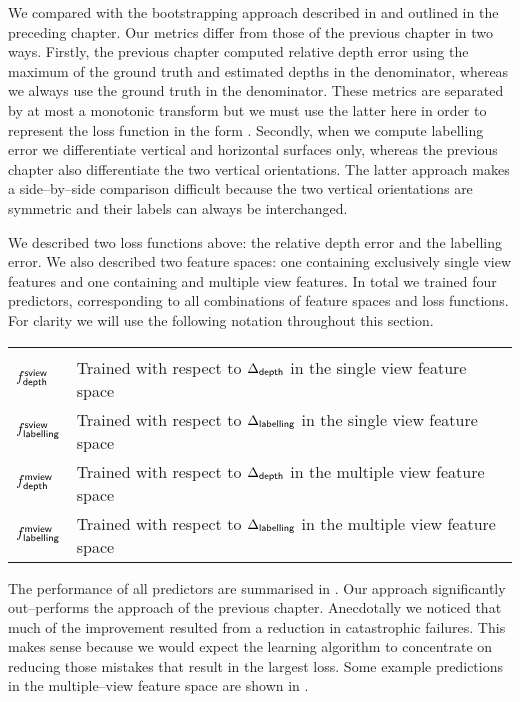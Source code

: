 We compared with the bootstrapping approach described in
\cite{Flint11} and outlined in the preceding chapter. Our metrics
differ from those of the previous chapter in two ways. Firstly, the
previous chapter computed relative depth error using the maximum of
the ground truth and estimated depths in the denominator, whereas we
always use the ground truth in the denominator. These metrics are
separated by at most a monotonic transform but we must use the latter
here in order to represent the loss function in the form
. Secondly, when we compute labelling error
we differentiate vertical and horizontal surfaces only, whereas the
previous chapter also differentiate the two vertical orientations. The
latter approach makes a side--by--side comparison difficult because
the two vertical orientations are symmetric and their labels can
always be interchanged.

We described two loss functions above: the relative depth error and
the labelling error. We also described two feature spaces: one
containing exclusively single view features and one containing and
multiple view features. In total we trained four predictors,
corresponding to all combinations of feature spaces and loss
functions. For clarity we will use the following notation throughout
this section.

\begin{tabular}{p{20mm}l}
  &\\
  $\Fsviewdepth$ & Trained with respect to
  $\DepthLoss$ in the single view feature space \vspace{2mm} \\
  $\Fsviewlbl$ & Trained with respect to
  $\LblLoss$ in the single view feature space \vspace{2mm} \\
  $\Fmviewdepth$ & Trained with respect to
  $\DepthLoss$ in the multiple view feature space \vspace{2mm} \\
  $\Fmviewlbl$ & Trained with respect to
  $\LblLoss$ in the multiple view feature space \vspace{2mm} 
\end{tabular}

The performance of all predictors are summarised in
. Our approach significantly
out--performs the approach of the previous chapter. Anecdotally we
noticed that much of the improvement resulted from a reduction in
catastrophic failures. This makes sense because we would expect the
learning algorithm to concentrate on reducing those mistakes that
result in the largest loss. Some example predictions in the
multiple--view feature space are shown in .


